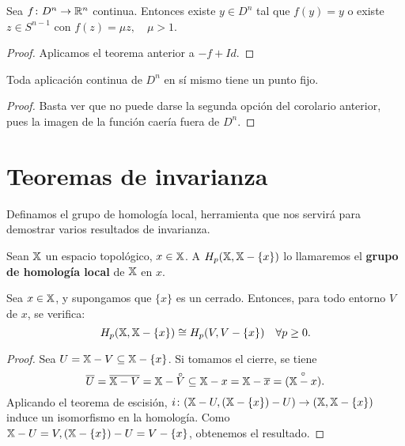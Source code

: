 \begin{corollary}
  Sea $f \colon D^n \to \mathbb{R}^n$ continua. Entonces existe $y \in D^n$ tal que $f(y) = y$ o existe $z \in S^{n-1}$ con $f(z) = \mu z, \quad \mu > 1$.
\end{corollary}

\begin{proof}
  Aplicamos el teorema anterior a $-f + Id$.
\end{proof}

\begin{corollary}
  Toda aplicación continua de $D^n$ en sí mismo tiene un punto fijo.
\end{corollary}

\begin{proof}
  Basta ver que no puede darse la segunda opción del corolario anterior, pues la imagen de la función caería fuera de $D^n$.
\end{proof}

\section{Teoremas de invarianza}

Definamos el grupo de homología local, herramienta que nos servirá para demostrar varios resultados de invarianza.

\begin{definition}
  Sean ${\mathbb X}$ un espacio topológico, $x \in {\mathbb X}$. A $H_p({\mathbb X}, {\mathbb X} - \{x\})$ lo llamaremos el \textbf{grupo de homología local} de ${\mathbb X}$ en $x$.
\end{definition}

\begin{proposition}
  Sea $x \in {\mathbb X}$, y supongamos que $\{x\}$ es un cerrado. Entonces, para todo entorno $V$ de $x$, se verifica:
  \[ H_p({\mathbb X}, {\mathbb X} - \{x\}) \cong H_p(V, V - \{x\}) \quad \forall p \geq 0. \]
\end{proposition}

\begin{proof}
  Sea $U = {\mathbb X} - V \subseteq {\mathbb X} - \{x\}$. Si tomamos el cierre, se tiene
  \[ \overline{U} = \overline{\X - V} = \X - \interior{V} \subseteq \X - x = \X - \overline{x} = \interior{(\X - x)} .\]
  Aplicando el teorema de escisión, $i \colon ({\mathbb X} - U, ({\mathbb X} - \{x\}) - U) \to ({\mathbb X}, {\mathbb X} - \{x\})$ induce un isomorfismo en la homología.
  Como ${\mathbb X} - U = V, ({\mathbb X} - \{x\}) - U = V - \{x\}$, obtenemos el resultado.
\end{proof}

